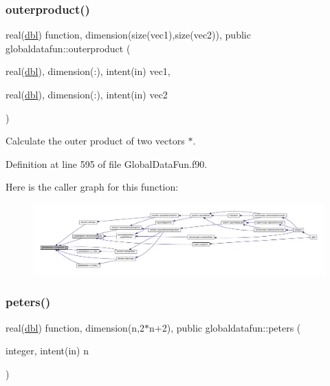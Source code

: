 \subsubsection{\texorpdfstring{outerproduct()}{outerproduct()}}
{\footnotesize\ttfamily real(\hyperlink{namespaceglobaldatafun_a5008801201dd34f2af8eae07756befb4}{dbl}) function, dimension(size(vec1),size(vec2)), public globaldatafun\+::outerproduct (\begin{DoxyParamCaption}\item[{real(\hyperlink{namespaceglobaldatafun_a5008801201dd34f2af8eae07756befb4}{dbl}), dimension(\+:), intent(in)}]{vec1,  }\item[{real(\hyperlink{namespaceglobaldatafun_a5008801201dd34f2af8eae07756befb4}{dbl}), dimension(\+:), intent(in)}]{vec2 }\end{DoxyParamCaption})}



Calculate the outer product of two vectors $\ast$. 



Definition at line 595 of file Global\+Data\+Fun.\+f90.

Here is the caller graph for this function\+:\nopagebreak
\begin{figure}[H]
\begin{center}
\leavevmode
\includegraphics[width=350pt]{namespaceglobaldatafun_af49b8ee04a8cfd5d42b863a092e17e91_icgraph}
\end{center}
\end{figure}
\mbox{\label{namespaceglobaldatafun_a9bdeebcd65cb298adc440430560beddc}} 
\subsubsection{\texorpdfstring{peters()}{peters()}}
{\footnotesize\ttfamily real(\hyperlink{namespaceglobaldatafun_a5008801201dd34f2af8eae07756befb4}{dbl}) function, dimension(n,2$\ast$n+2), public globaldatafun\+::peters (\begin{DoxyParamCaption}\item[{integer, intent(in)}]{n }\end{DoxyParamCaption})}



